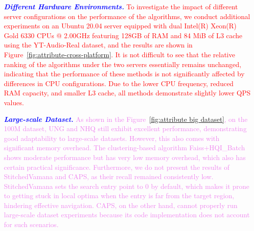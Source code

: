 \documentclass[sigconf, nonacm]{acmart}
\begin{document}
{	\textit{\textbf{\textcolor{blue}{Different Hardware Environments.}}} 
	\textcolor{red}{To investigate the impact of different server configurations on the performance of the algorithms, we conduct additional experiments on an Ubuntu 20.04 server equipped with dual Intel(R) Xeon(R) Gold 6330 CPUs @ 2.00GHz featuring 128GB of RAM and 84 MiB of L3 cache using the YT-Audio-Real dataset, and the results are shown in Figure~\ref{fig:attribute-cross-platform}. It is not difficult to see that the relative ranking of the algorithms under the two servers essentially remains unchanged, indicating that the performance of these methods is not significantly affected by differences in CPU configurations. Due to the lower CPU frequency, reduced RAM capacity, and smaller L3 cache, all methods demonstrate slightly lower QPS values.}

	\textit{\textbf{\textcolor{blue}{Large-scale Dataset.}}} 
	\textcolor{violet}{As shown in the Figure~\ref{fig:attribute big dataset}, on the 100M dataset, UNG and NHQ still exhibit excellent performance, demonstrating good adaptability to large-scale datasets. However, this also comes with significant memory overhead. The clustering-based algorithm Faiss+HQI\_Batch shows moderate performance but has very low memory overhead, which also has certain practical significance. Furthermore, we do not present the results of StitchedVamana and CAPS, as their recall remained consistently low. StitchedVamana sets the search entry point to 0 by default, which makes it prone to getting stuck in local optima when the entry is far from the target region, hindering effective navigation. CAPS, on the other hand, cannot properly run large-scale dataset experiments because its code implementation does not account for such scenarios.}
	
}
\end{document}
